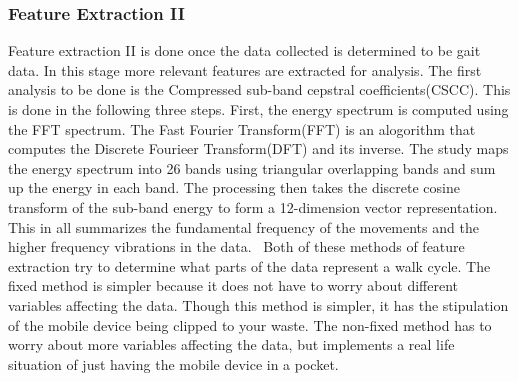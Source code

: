\documentclass{sig-alternate}
\begin{document}
\subsubsection{Feature Extraction II}{
	Feature extraction II is done once the data collected is determined to be gait data. In this stage more relevant features are extracted for analysis. The first analysis to be done is the Compressed sub-band cepstral coefficients(CSCC). This is done in the following three steps. First, the energy spectrum is computed using the FFT spectrum. The Fast Fourier Transform(FFT) is an alogorithm that computes the Discrete Fourieer Transform(DFT) and its inverse. The study maps the energy spectrum into 26 bands using triangular overlapping bands and sum up the energy in each band. The processing then takes the discrete cosine transform of the sub-band energy to form a 12-dimension vector representation. This in all summarizes the fundamental frequency of the movements and the higher frequency vibrations in the data.~\cite{Sujithra:2012}
}
	Both of these methods of feature extraction try to determine what parts of the data represent a walk cycle. The fixed method is simpler because it does not have to worry about different variables affecting the data. Though this method is simpler, it has the stipulation of the mobile device being clipped to your waste. The non-fixed method has to worry about more variables affecting the data, but implements a real life situation of just having the mobile device in a pocket.
	
	
	
		
\end{document}
